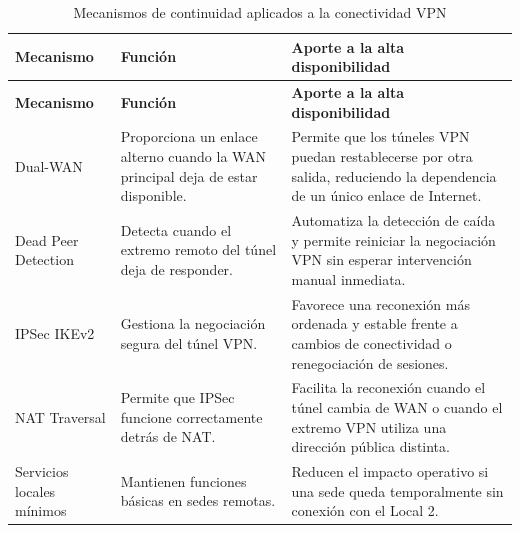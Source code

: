 \documentclass[11pt, a4paper, oneside]{report}
\begin{document}
\begin{xltabular}{\textwidth}{@{}|L{3.4cm}|L{3.5cm}|X|@{}}
\caption{Mecanismos de continuidad aplicados a la conectividad VPN}
\label{tab:mecanismos_continuidad_vpn} \\

\parbox[c][1.1cm][c]{\linewidth}{\centering\color{white}\bfseries\small Mecanismo} &
\parbox[c][1.1cm][c]{\linewidth}{\centering\color{white}\bfseries\small Función} &
\parbox[c][1.1cm][c]{\linewidth}{\centering\color{white}\bfseries\small Aporte a la alta disponibilidad} \\ \hline
\endfirsthead

\parbox[c][1.1cm][c]{\linewidth}{\centering\color{white}\bfseries\small Mecanismo} &
\parbox[c][1.1cm][c]{\linewidth}{\centering\color{white}\bfseries\small Función} &
\parbox[c][1.1cm][c]{\linewidth}{\centering\color{white}\bfseries\small Aporte a la alta disponibilidad} \\ \hline
\endhead

\hline
\endfoot

{\small Dual-WAN} &
{\small Proporciona un enlace alterno cuando la WAN principal deja de estar disponible.} &
{\small Permite que los túneles VPN puedan restablecerse por otra salida, reduciendo la dependencia de un único enlace de Internet.} \\ \hline

{\small Dead Peer Detection} &
{\small Detecta cuando el extremo remoto del túnel deja de responder.} &
{\small Automatiza la detección de caída y permite reiniciar la negociación VPN sin esperar intervención manual inmediata.} \\ \hline

{\small IPSec IKEv2} &
{\small Gestiona la negociación segura del túnel VPN.} &
{\small Favorece una reconexión más ordenada y estable frente a cambios de conectividad o renegociación de sesiones.} \\ \hline

{\small NAT Traversal} &
{\small Permite que IPSec funcione correctamente detrás de NAT.} &
{\small Facilita la reconexión cuando el túnel cambia de WAN o cuando el extremo VPN utiliza una dirección pública distinta.} \\ \hline

{\small Servicios locales mínimos} &
{\small Mantienen funciones básicas en sedes remotas.} &
{\small Reducen el impacto operativo si una sede queda temporalmente sin conexión con el Local 2.} \\ \hline

\end{xltabular}
\end{document}
